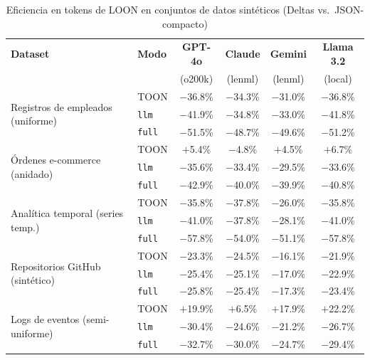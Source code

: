 
\begin{table}[t]
  \centering
  \caption{Eficiencia en tokens de LOON en conjuntos de datos sintéticos (Deltas vs.\ JSON-compacto)}
  \label{tab:tokens-synth}
  \scriptsize
  \begin{tabular}{@{}llcccc@{}}
    \toprule
    \textbf{Dataset} & \textbf{Modo} & \textbf{GPT-4o} & \textbf{Claude} & \textbf{Gemini} & \textbf{Llama 3.2} \\
     & & \scriptsize (o200k) & \scriptsize (lenml) & \scriptsize (lenml) & \scriptsize (local) \\
    \midrule
    \multirow{3}{*}{Registros de empleados (uniforme)} & TOON & $-$36.8\% & $-$34.3\% & $-$31.0\% & $-$36.8\% \\
     & \texttt{llm} & $-$41.9\% & $-$34.8\% & $-$33.0\% & $-$41.8\% \\
     & \texttt{full} & $-$51.5\% & $-$48.7\% & $-$49.6\% & $-$51.2\% \\
    \cline{2-6}
    \multirow{3}{*}{Órdenes e-commerce (anidado)} & TOON & $+$5.4\% & $-$4.8\% & $+$4.5\% & $+$6.7\% \\
     & \texttt{llm} & $-$35.6\% & $-$33.4\% & $-$29.5\% & $-$33.6\% \\
     & \texttt{full} & $-$42.9\% & $-$40.0\% & $-$39.9\% & $-$40.8\% \\
    \cline{2-6}
    \multirow{3}{*}{Analítica temporal (series temp.)} & TOON & $-$35.8\% & $-$37.8\% & $-$26.0\% & $-$35.8\% \\
     & \texttt{llm} & $-$41.0\% & $-$37.8\% & $-$28.1\% & $-$41.0\% \\
     & \texttt{full} & $-$57.8\% & $-$54.0\% & $-$51.1\% & $-$57.8\% \\
    \cline{2-6}
    \multirow{3}{*}{Repositorios GitHub (sintético)} & TOON & $-$23.3\% & $-$24.5\% & $-$16.1\% & $-$21.9\% \\
     & \texttt{llm} & $-$25.4\% & $-$25.1\% & $-$17.0\% & $-$22.9\% \\
     & \texttt{full} & $-$25.8\% & $-$25.4\% & $-$17.3\% & $-$23.4\% \\
    \cline{2-6}
    \multirow{3}{*}{Logs de eventos (semi-uniforme)} & TOON & $+$19.9\% & $+$6.5\% & $+$17.9\% & $+$22.2\% \\
     & \texttt{llm} & $-$30.4\% & $-$24.6\% & $-$21.2\% & $-$26.7\% \\
     & \texttt{full} & $-$32.7\% & $-$30.0\% & $-$24.7\% & $-$29.4\% \\
    \bottomrule
  \end{tabular}
\end{table}

